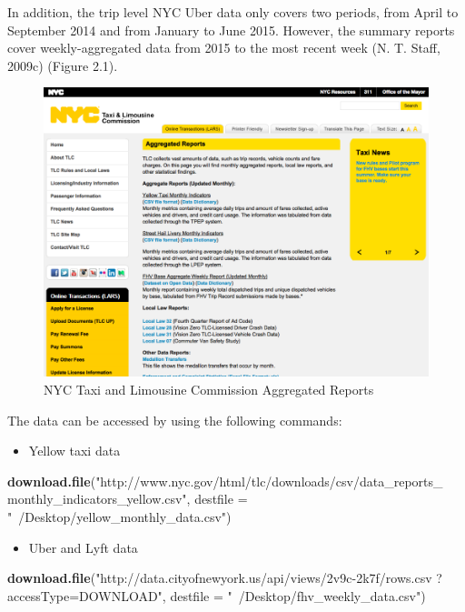 \documentclass[12pt,twoside]{reedthesis}
\newenvironment{Shaded}{\begin{snugshade}}{\end{snugshade}}
\newcommand{\KeywordTok}[1]{\textcolor[rgb]{0.13,0.29,0.53}{\textbf{#1}}}
\newcommand{\DataTypeTok}[1]{\textcolor[rgb]{0.13,0.29,0.53}{#1}}
\newcommand{\StringTok}[1]{\textcolor[rgb]{0.31,0.60,0.02}{#1}}
\newcommand{\NormalTok}[1]{#1}
\providecommand{\tightlist}{%
  \setlength{\itemsep}{0pt}\setlength{\parskip}{0pt}}
\theoremstyle{definition}
\theoremstyle{definition}
\theoremstyle{definition}
\theoremstyle{remark}
\begin{document}
In addition, the trip level NYC Uber data only covers two periods, from
April to September 2014 and from January to June 2015. However, the
summary reports cover weekly-aggregated data from 2015 to the most
recent week (N. T. Staff, 2009c) (Figure 2.1).
\begin{figure}[h]

{\centering \includegraphics[width=5.84in]{figure/a-report} 

}

\caption{NYC Taxi and Limousine Commission Aggregated Reports}\label{fig:a-report}
\end{figure}
The data can be accessed by using the following commands:
\begin{itemize}
\tightlist
\item
  Yellow taxi data
\end{itemize}
\begin{Shaded}
\begin{Highlighting}[]
\KeywordTok{download.file}\NormalTok{(}\StringTok{"http://www.nyc.gov/html/tlc/downloads/csv/data_reports_}
\StringTok{              monthly_indicators_yellow.csv"}\NormalTok{, }
              \DataTypeTok{destfile =} \StringTok{"~/Desktop/yellow_monthly_data.csv"}\NormalTok{)}
\end{Highlighting}
\end{Shaded}
\begin{itemize}
\tightlist
\item
  Uber and Lyft data
\end{itemize}
\begin{Shaded}
\begin{Highlighting}[]
\KeywordTok{download.file}\NormalTok{(}\StringTok{"http://data.cityofnewyork.us/api/views/2v9c-2k7f/rows.csv}
\StringTok{              ?accessType=DOWNLOAD"}\NormalTok{, }
              \DataTypeTok{destfile =} \StringTok{"~/Desktop/fhv_weekly_data.csv"}\NormalTok{)}
\end{Highlighting}
\end{Shaded}
\end{document}
